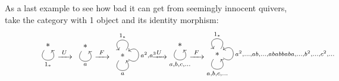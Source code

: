 \begin{example}\label{ex:U-F-U-F_from_singleton}
As a last example to see how bad it can get from seemingly innocent quivers, take the category with 1 object and its identity morphism:
\[
\noindent\begin{minipage}{.005\textwidth}
\phantom{}
\end{minipage}
\begin{minipage}{.08\textwidth}
\begin{tikzcd}
\ast \arrow["1_{\ast}"', loop, distance=2em, in=305, out=235]
\end{tikzcd}
\end{minipage}
%
\begin{minipage}{.05\textwidth}
$\xrightarrow{\text{     }U\text{     }}$
\end{minipage}
%
\begin{minipage}{.08\textwidth}
\begin{tikzcd}
\ast \arrow["a"', loop, distance=2em, in=305, out=235]
\end{tikzcd}
\end{minipage}
%
\begin{minipage}{.05\textwidth}
$\xrightarrow{\text{     }F\text{     }}$
\end{minipage}
%
\begin{minipage}{.15\textwidth}
\begin{tikzcd}
\ast \arrow["a"', loop, distance=2em, in=305, out=235] \arrow["1_{\ast}"', loop, distance=2em, in=125, out=55] \arrow["{a^{2}, a^{3},\dots}"', loop, distance=2em, in=35, out=325]
\end{tikzcd}
\end{minipage}
%
\begin{minipage}{.05\textwidth}
$\xrightarrow{\text{     }U\text{     }}$
\end{minipage}
%
\begin{minipage}{.08\textwidth}
\begin{tikzcd}
\ast \arrow["{a, b, c,\dots}"', loop, distance=2em, in=305, out=235]
\end{tikzcd}
\end{minipage}
%
\begin{minipage}{.05\textwidth}
$\xrightarrow{\text{     }F\text{     }}$
\end{minipage}
%
\begin{minipage}{.25\textwidth}
\begin{tikzcd}
\ast \arrow["{a, b, c,\dots}"', loop, distance=2em, in=305, out=235] \arrow["1_{\ast}"', loop, distance=2em, in=125, out=55] \arrow["{a^{2},\dots,ab,\dots,ababbaba,\dots,b^{2},\dots,c^{2},\dots}"', loop, distance=2em, in=35, out=325]

\end{tikzcd}
\end{minipage}\]
\end{example}

